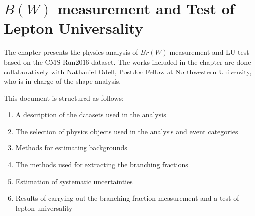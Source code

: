 \chapter{$B(W)$ measurement and Test of Lepton Universality}
\label{sec:analysis}


The chapter presents the physics analysis of $Br(W)$ measurement and LU test based on the CMS Run2016 dataset. 
The works included in the chapter are done collaboratively with Nathaniel Odell, Postdoc Fellow at Northwestern University, 
who is in charge of the shape analysis. 





This document is structured as follows:

\begin{enumerate}
    \item A description of the datasets used in the analysis
    \item The selection of physics objects used in the analysis and event categories
    \item Methods for estimating backgrounds
    \item The methods used for extracting the branching fractions
    \item Estimation of systematic uncertainties
    \item Results of carrying out the branching fraction measurement and a test of lepton universality
\end{enumerate}
    
    











